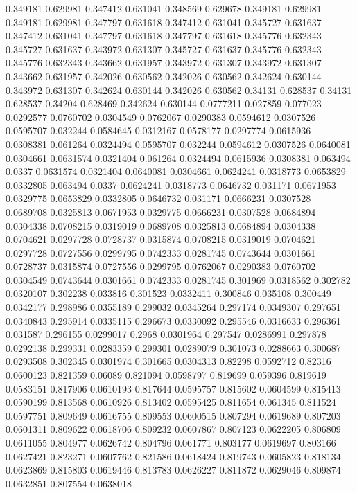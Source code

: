 0.349181 0.629981
0.347412 0.631041
0.348569 0.629678
0.349181 0.629981
0.349181 0.629981
0.347797 0.631618
0.347412 0.631041
0.345727 0.631637
0.347412 0.631041
0.347797 0.631618
0.347797 0.631618
0.345776 0.632343
0.345727 0.631637
0.343972 0.631307
0.345727 0.631637
0.345776 0.632343
0.345776 0.632343
0.343662 0.631957
0.343972 0.631307
0.343972 0.631307
0.343662 0.631957
0.342026 0.630562
0.342026 0.630562
0.342624 0.630144
0.343972 0.631307
0.342624 0.630144
0.342026 0.630562
0.34131 0.628537
0.34131 0.628537
0.34204 0.628469
0.342624 0.630144
0.0777211 0.027859
0.077023 0.0292577
0.0760702 0.0304549
0.0762067 0.0290383
0.0594612 0.0307526
0.0595707 0.032244
0.0584645 0.0312167
0.0578177 0.0297774
0.0615936 0.0308381
0.061264 0.0324494
0.0595707 0.032244
0.0594612 0.0307526
0.0640081 0.0304661
0.0631574 0.0321404
0.061264 0.0324494
0.0615936 0.0308381
0.063494 0.0337
0.0631574 0.0321404
0.0640081 0.0304661
0.0624241 0.0318773
0.0653829 0.0332805
0.063494 0.0337
0.0624241 0.0318773
0.0646732 0.031171
0.0671953 0.0329775
0.0653829 0.0332805
0.0646732 0.031171
0.0666231 0.0307528
0.0689708 0.0325813
0.0671953 0.0329775
0.0666231 0.0307528
0.0684894 0.0304338
0.0708215 0.0319019
0.0689708 0.0325813
0.0684894 0.0304338
0.0704621 0.0297728
0.0728737 0.0315874
0.0708215 0.0319019
0.0704621 0.0297728
0.0727556 0.0299795
0.0742333 0.0281745
0.0743644 0.0301661
0.0728737 0.0315874
0.0727556 0.0299795
0.0762067 0.0290383
0.0760702 0.0304549
0.0743644 0.0301661
0.0742333 0.0281745
0.301969 0.0318562
0.302782 0.0320107
0.302238 0.033816
0.301523 0.0332411
0.300846 0.035108
0.300449 0.0342177
0.298986 0.0355189
0.299032 0.0345264
0.297174 0.0349307
0.297651 0.0340843
0.295914 0.0335115
0.296673 0.0330092
0.295546 0.0316633
0.296361 0.031587
0.296155 0.0299017
0.2968 0.0301964
0.297547 0.0286991
0.297878 0.0292138
0.299331 0.0283359
0.299301 0.0289079
0.301073 0.0288663
0.300687 0.0293508
0.302345 0.0301974
0.301665 0.0304313
0.82298 0.0592712
0.82316 0.0600123
0.821359 0.06089
0.821094 0.0598797
0.819699 0.059396
0.819619 0.0583151
0.817906 0.0610193
0.817644 0.0595757
0.815602 0.0604599
0.815413 0.0590199
0.813568 0.0610926
0.813402 0.0595425
0.811654 0.061345
0.811524 0.0597751
0.809649 0.0616755
0.809553 0.0600515
0.807294 0.0619689
0.807203 0.0601311
0.809622 0.0618706
0.809232 0.0607867
0.807123 0.0622205
0.806809 0.0611055
0.804977 0.0626742
0.804796 0.061771
0.803177 0.0619697
0.803166 0.0627421
0.823271 0.0607762
0.821586 0.0618424
0.819743 0.0605823
0.818134 0.0623869
0.815803 0.0619446
0.813783 0.0626227
0.811872 0.0629046
0.809874 0.0632851
0.807554 0.0638018

